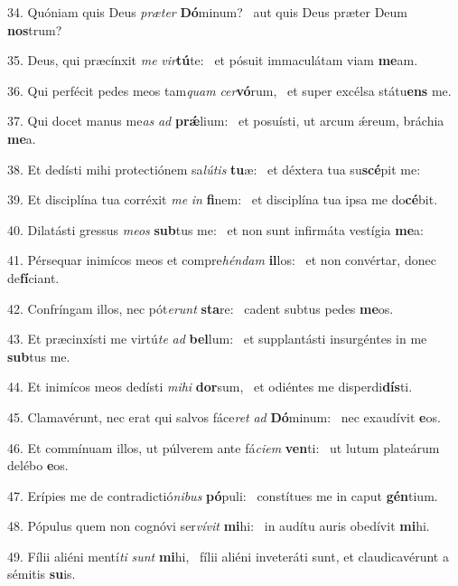 34. Quóniam quis Deus \textit{præ}\textit{ter} \textbf{Dó}minum? \ast\  aut quis Deus præter Deum \textbf{nos}trum?\

35. Deus, qui præcínxit \textit{me} \textit{vir}\textbf{tú}te: \ast\  et pósuit immaculátam viam \textbf{me}am.\

36. Qui perfécit pedes meos tam\textit{quam} \textit{cer}\textbf{vó}rum, \ast\  et super excélsa státu\textbf{ens} me.\

37. Qui docet manus me\textit{as} \textit{ad} \textbf{prǽ}lium: \ast\  et posuísti, ut arcum ǽreum, bráchia \textbf{me}a.\

38. Et dedísti mihi protectiónem sa\textit{lú}\textit{tis} \textbf{tu}æ: \ast\  et déxtera tua su\textbf{scé}pit me:\

39. Et disciplína tua corréxit \textit{me} \textit{in} \textbf{fi}nem: \ast\  et disciplína tua ipsa me do\textbf{cé}bit.\

40. Dilatásti gressus \textit{me}\textit{os} \textbf{sub}tus me: \ast\  et non sunt infirmáta vestígia \textbf{me}a:\

41. Pérsequar inimícos meos et compre\textit{hén}\textit{dam} \textbf{il}los: \ast\  et non convértar, donec de\textbf{fí}ciant.\

42. Confríngam illos, nec pót\textit{e}\textit{runt} \textbf{sta}re: \ast\  cadent subtus pedes \textbf{me}os.\

43. Et præcinxísti me virtú\textit{te} \textit{ad} \textbf{bel}lum: \ast\  et supplantásti insurgéntes in me \textbf{sub}tus me.\

44. Et inimícos meos dedísti \textit{mi}\textit{hi} \textbf{dor}sum, \ast\  et odiéntes me disperdi\textbf{dís}ti.\

45. Clamavérunt, nec erat qui salvos fáce\textit{ret} \textit{ad} \textbf{Dó}minum: \ast\  nec exaudívit \textbf{e}os.\

46. Et commínuam illos, ut púlverem ante fá\textit{ci}\textit{em} \textbf{ven}ti: \ast\  ut lutum plateárum delébo \textbf{e}os.\

47. Erípies me de contradictió\textit{ni}\textit{bus} \textbf{pó}puli: \ast\  constítues me in caput \textbf{gén}tium.\

48. Pópulus quem non cognóvi ser\textit{ví}\textit{vit} \textbf{mi}hi: \ast\  in audítu auris obedívit \textbf{mi}hi.\

49. Fílii aliéni mentí\textit{ti} \textit{sunt} \textbf{mi}hi, \ast\  fílii aliéni inveteráti sunt, et claudicavérunt a sémitis \textbf{su}is.\


